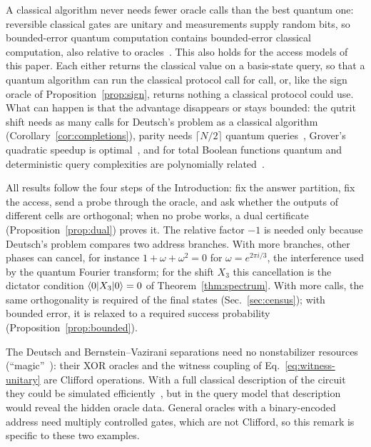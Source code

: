 \documentclass[
  aps,
  pra,
  reprint,
  nofootinbib
]{revtex4-2}
\begin{document}
A classical algorithm never needs fewer oracle calls than the best quantum
one: reversible classical gates are unitary and measurements supply random
bits, so bounded-error quantum computation contains bounded-error classical
computation, also relative to oracles~\cite{be-va}. This also holds for the
access models of this paper. Each
either returns the classical value on a basis-state query, so that a quantum
algorithm can run the classical protocol call for call, or, like the sign
oracle of Proposition~\ref{prop:sign}, returns nothing a classical protocol
could use. What can happen is that the advantage disappears or stays
bounded: the qutrit shift needs as many calls for Deutsch's problem as a
classical algorithm (Corollary~\ref{cor:completions}), parity needs
\(\lceil N/2\rceil\) quantum queries~\cite{Farhi-98,bbcmw-01}, Grover's
quadratic speedup is optimal~\cite{benn:97}, and for total Boolean functions
quantum and deterministic query complexities are polynomially
related~\cite{bbcmw-01}.

All results follow the four steps of the Introduction: fix the answer
partition, fix the access, send a probe through the oracle, and ask whether
the outputs of different cells are orthogonal; when no probe works, a dual
certificate (Proposition~\ref{prop:dual}) proves it. The relative factor
\(-1\) is needed only because Deutsch's problem compares two address
branches. With more branches, other phases can cancel, for instance
\(1+\omega+\omega^2=0\) for \(\omega=e^{2\pi i/3}\), the interference used by
the quantum Fourier transform; for the shift \(X_3\) this cancellation is
the dictator condition \(\braket{0|X_3|0}=0\) of
Theorem~\ref{thm:spectrum}. With more calls, the same orthogonality is
required of the final states (Sec.~\ref{sec:census}); with bounded error, it
is relaxed to a required success probability
(Proposition~\ref{prop:bounded}).

The Deutsch and Bernstein--Vazirani separations need no nonstabilizer
resources (``magic''~\cite{Veitch2014}): their XOR oracles and the witness
coupling of Eq.~\eqref{eq:witness-unitary} are Clifford operations. With a
full classical description of the circuit they could be simulated
efficiently~\cite{GottesmanKnill,AaronsonGottesman2004}, but in the query
model that description would reveal the hidden oracle data. General oracles
with a binary-encoded address need multiply controlled gates, which are not
Clifford, so this remark is specific to these two examples.
\end{document}
